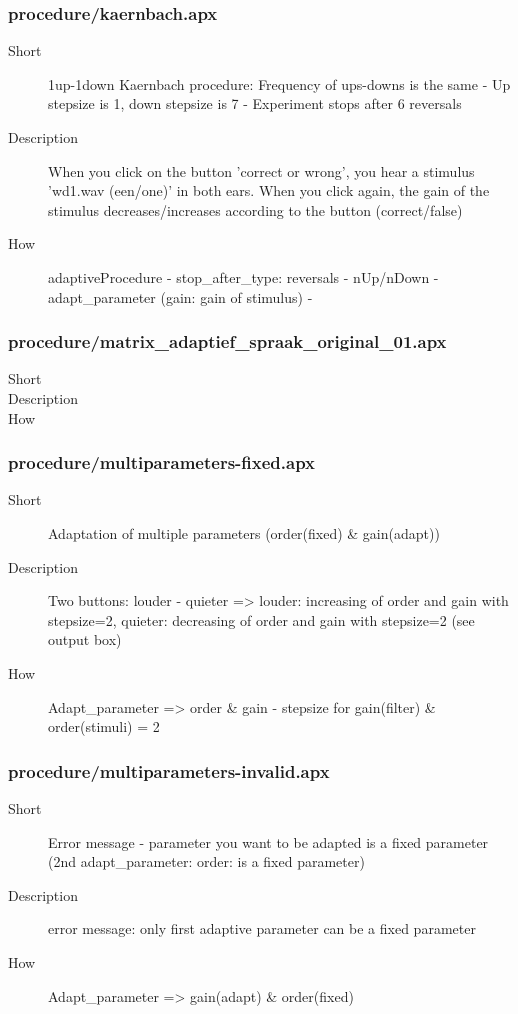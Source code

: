 \subsubsection{procedure/kaernbach.apx}
\begin{description}
\item[Short] 
 1up-1down Kaernbach procedure: Frequency of ups-downs is the same - Up stepsize is 1, down stepsize is 7 - Experiment stops after 6 reversals
\item[Description] 
 When you click on the button 'correct or wrong', you hear a stimulus 'wd1.wav (een/one)' in both ears. When you click again, the gain of the stimulus decreases/increases according to the button (correct/false)
\item[How] 
 adaptiveProcedure - stop\_after\_type: reversals - nUp/nDown - adapt\_parameter (gain: gain of stimulus) -
\end{description}

\subsubsection{procedure/matrix\_adaptief\_spraak\_original\_01.apx}
\begin{description}
\item[Short] 
\item[Description] 
\item[How] 
\end{description}

\subsubsection{procedure/multiparameters-fixed.apx}
\begin{description}
\item[Short] 
 Adaptation of multiple parameters (order(fixed) \& gain(adapt))
\item[Description] 
 Two buttons: louder - quieter =\textgreater{} louder: increasing of order and gain with stepsize=2, quieter: decreasing of order and gain with stepsize=2 (see output box)
\item[How] 
 Adapt\_parameter =\textgreater{} order \& gain - stepsize for gain(filter) \& order(stimuli) = 2
\end{description}

\subsubsection{procedure/multiparameters-invalid.apx}
\begin{description}
\item[Short] 
 Error message - parameter you want to be adapted is a fixed parameter (2nd adapt\_parameter: order: is a fixed parameter)
\item[Description] 
 error message: only first adaptive parameter can be a fixed parameter
\item[How] 
 Adapt\_parameter =\textgreater{} gain(adapt) \& order(fixed)
\end{description}

